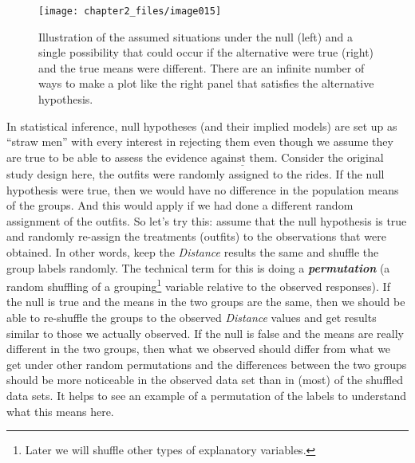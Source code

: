 \documentclass[
]{book}
\begin{document}
\begin{figure}[ht!]

{\centering \texttt{[image: chapter2\_files/image015]} 

}

\caption{Illustration of the assumed situations under the null (left) and a single possibility that could occur if the alternative were true (right) and the true means were different. There are an infinite number of ways to make a plot like the right panel that satisfies the alternative hypothesis.}\label{fig:Figure2-6}
\end{figure}

\indent In statistical inference, null hypotheses (and their
implied models) are set
up as ``straw men'' with every interest in rejecting them even though we assume
they are true to be able to assess the evidence \(\underline{\text{against them}}\).
Consider the original study design here, the outfits were randomly assigned to
the rides. If the null hypothesis were true, then we would have no difference
in the population means of the groups. And this would apply if we had done a
different random assignment  of the outfits. So let's try this:
assume that the null hypothesis is true and randomly re-assign the treatments
(outfits) to the observations that were obtained. In other words, keep the
\emph{Distance} results the same and shuffle the group labels randomly. The
technical term for this is doing a \textbf{\emph{permutation}}  (a random shuffling of
a grouping\footnote{Later we will shuffle other types of explanatory variables.} variable relative to the observed responses). If the null is true
and the means
in the two groups are the same, then we should be able to re-shuffle the
groups to the observed \emph{Distance} values and get results similar to those we
actually observed. If the null is false and the means are really different in
the two groups, then what we observed should differ from what we get under
other random permutations and the differences between the two groups should be
more noticeable in the observed data set than in (most) of the shuffled data
sets. It helps to see an example of a permutation of the labels to understand
what this means here.
\end{document}
